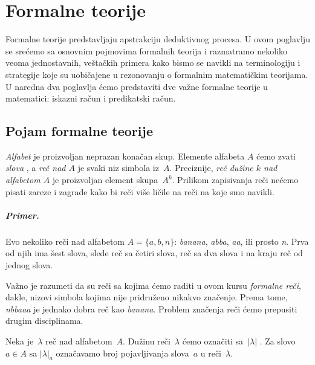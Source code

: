 \newcommand\Pal{\mathit{Pal}}
\newcommand\Zag{\mathit{Zag}}
\newcommand\BinSab{\mathit{BinSab}}
\newcommand\Sab{\mathit{Sab}}
\newcommand\Mnoz{\mathit{Mnoz}}
\newcommand\Sloz{\mathit{Sloz}}
\newcommand\Prost{\mathit{Prost}}
\newcommand\Th{\mathrm{Th}}

\chapter{Formalne teorije}

Formalne teorije predstavljaju apstrakciju deduktivnog procesa. U ovom poglavlju
se sre\'cemo sa osnovnim pojmovima formalnih teorija i razmatramo nekoliko
veoma jednostavnih, ve\v sta\v ckih primera kako bismo se navikli na terminologiju
i strategije koje su uobi\v cajene u rezonovanju o formalnim matemati\v ckim
teorijama. U naredna dva poglavlja \'cemo predstaviti dve va\v zne formalne teorije
u matematici: iskazni ra\v cun i predikatski ra\v cun.

\section{Pojam formalne teorije}

\emph{Alfabet}%
je proizvoljan neprazan kona\v can skup. Elemente alfabeta $A$ \'cemo
zvati \emph{slova}%
    ,
a \emph{re\v c nad $A$}%
je svaki niz simbola iz~$A$.
Preciznije, \emph{re\v c du\v zine $k$ nad alfabetom $A$} je proizvoljan element skupa~$A^k$.
Prilikom zapisivanja re\v ci ne\'cemo pisati zareze i zagrade kako bi re\v ci vi\v se li\v cile na
re\v ci na koje smo navikli.

\paragraph{Primer.}
  Evo nekoliko re\v ci nad alfabetom $A = \{a, b, n\}$: \textit{banana}, \textit{abba},
  \textit{aa}, ili prosto \textit{n}. Prva od njih ima \v sest slova, slede re\v c sa \v cetiri
  slova, re\v c sa dva slova i na kraju re\v c od jednog slova.

\bigskip

Va\v zno je razumeti da su re\v ci sa kojima \'cemo raditi u ovom kursu \emph{formalne re\v ci},
dakle, nizovi simbola kojima nije pridru\v zeno nikakvo zna\v cenje. Prema tome,
\textit{nbbaaa} je jednako dobra re\v c kao \textit{banana}. Problem zna\v cenja
re\v ci \'cemo prepusiti drugim disciplinama.

Neka je~$\lambda$ re\v c nad alfabetom~$A$.
Du\v zinu re\v ci~$\lambda$%
\'cemo ozna\v citi sa~$|\lambda|$%
    .
Za slovo~$a \in A$ sa $|\lambda|_a$%
ozna\v cavamo broj pojavljivanja slova~$a$ u re\v ci~$\lambda$.

